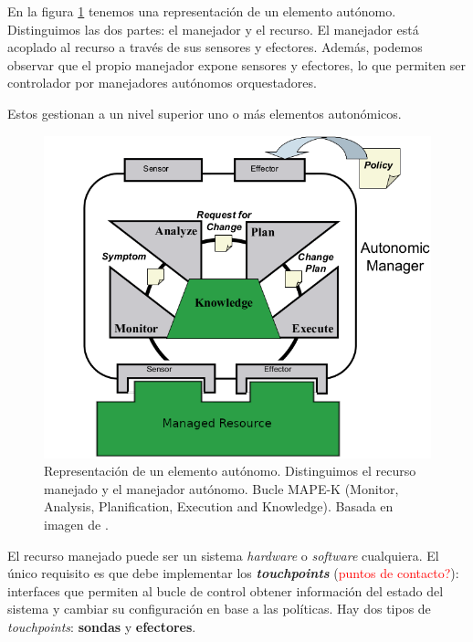 En la figura \ref{fig:autonomic-element} tenemos una representación de un elemento autónomo. Distinguimos las dos partes: el manejador y el recurso. El manejador está acoplado al recurso a través de sus sensores y efectores. Además, podemos observar que el propio manejador expone sensores y efectores, lo que permiten ser controlador por manejadores autónomos orquestadores.

Estos gestionan a un nivel superior uno o más elementos autonómicos.

\begin{figure}[h]
  \centering
  \includegraphics[scale=2]{02_contexto_tecnologico/images/autonomic-element}
  \caption[Representación de un elemento autónomo. Distinguimos el recurso manejado y el manejador autónomo. Bucle MAPE-K (Monitor, Analysis, Planification, Execution and Knowledge)]{Representación de un elemento autónomo. Distinguimos el recurso manejado y el manejador autónomo. Bucle MAPE-K (Monitor, Analysis, Planification, Execution and Knowledge). Basada en imagen de \cite{ibmcorporationArchitecturalBlueprintAutonomic2006}.}
  \label{fig:autonomic-element}
\end{figure}

El recurso manejado puede ser un sistema \emph{hardware} o \emph{software} cualquiera. El único requisito es que debe implementar los \textbf{\emph{touchpoints}} (\textcolor{red}{puntos de contacto?}): interfaces que permiten al bucle de control obtener información del estado del sistema y cambiar su configuración en base a las políticas. Hay dos tipos de \emph{touchpoints}: \textbf{sondas} y \textbf{efectores}.

